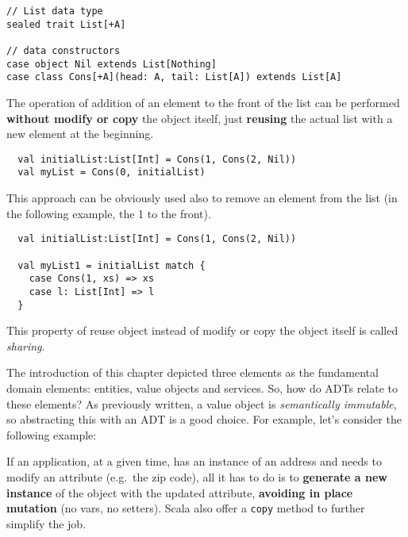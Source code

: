 \begin{verbatim}
// List data type
sealed trait List[+A]

// data constructors
case object Nil extends List[Nothing]
case class Cons[+A](head: A, tail: List[A]) extends List[A]
\end{verbatim}

The operation of addition of an element to the front of the list can be
performed \textbf{without modify or copy} the object itself, just
\textbf{reusing} the actual list with a new element at the beginning.

\begin{verbatim}
  val initialList:List[Int] = Cons(1, Cons(2, Nil))
  val myList = Cons(0, initialList)
\end{verbatim}

This approach can be obviously used also to remove an element from the
list (in the following example, the 1 to the front).

\begin{verbatim}
  val initialList:List[Int] = Cons(1, Cons(2, Nil))

  val myList1 = initialList match {
    case Cons(1, xs) => xs
    case l: List[Int] => l
  }
\end{verbatim}

This property of reuse object instead of modify or copy the object
itself is called \emph{sharing}.

The introduction of this chapter depicted three elements as the
fundamental domain elements: entities, value objects and services. So,
how do ADTs relate to these elements? As previously written, a value
object is \emph{semantically immutable}, so abstracting this with an ADT
is a good choice. For example, let's consider the following example:

\begin{Shaded}
\begin{Highlighting}[]
  
\end{Highlighting}
\end{Shaded}

If an application, at a given time, has an instance of an address and
needs to modify an attribute (e.g.~the zip code), all it has to do is to
\textbf{generate a new instance} of the object with the updated
attribute, \textbf{avoiding in place mutation} (no vars, no setters).
Scala also offer a \texttt{copy} method to further simplify the job.

